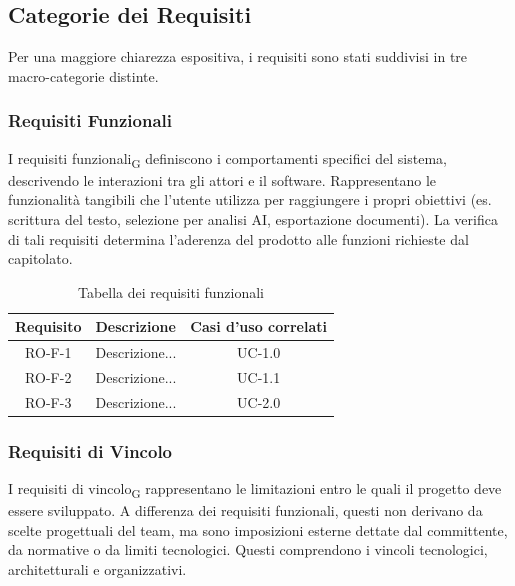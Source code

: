 \documentclass[11pt,a4paper]{article}
\begin{document}
\subsection{Categorie dei Requisiti}
Per una maggiore chiarezza espositiva, i requisiti sono stati suddivisi in tre macro-categorie distinte.

\subsubsection{Requisiti Funzionali}
I requisiti funzionali\textsubscript{G} definiscono i comportamenti specifici del sistema, descrivendo le interazioni tra gli attori e il software.
Rappresentano le funzionalità tangibili che l'utente utilizza per raggiungere i propri obiettivi (es. scrittura del testo, selezione per analisi AI, esportazione documenti). La verifica di tali requisiti determina l'aderenza del prodotto alle funzioni richieste dal capitolato.


\begin{table}[H]
    \centering
    \begin{tabular}{|c|>{\raggedright\arraybackslash}p{}|c|}
        \hline
        \textbf{Requisito} & \textbf{Descrizione} & \textbf{Casi d'uso correlati}\\
        \hline
        RO-F-1 & Descrizione... & UC-1.0 \\
        \hline
        RO-F-2 & Descrizione... & UC-1.1 \\
        \hline
        RO-F-3 &Descrizione... & UC-2.0 \\
        \hline
    \end{tabular}
    \caption{Tabella dei requisiti funzionali}
\end{table}


\subsubsection{Requisiti di Vincolo}
I requisiti di vincolo\textsubscript{G} rappresentano le limitazioni entro le quali il progetto deve essere sviluppato. A differenza dei requisiti funzionali, questi non derivano da scelte progettuali del team, ma sono imposizioni esterne dettate dal committente, da normative o da limiti tecnologici.
Questi comprendono i vincoli tecnologici, architetturali e organizzativi.

\end{document}
